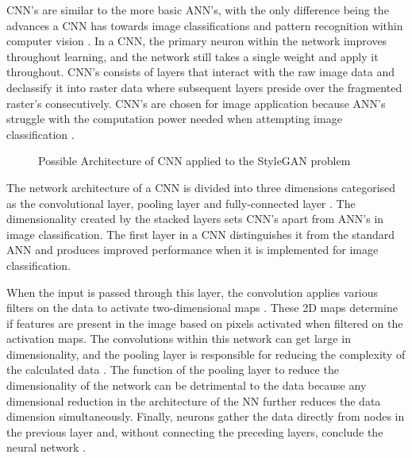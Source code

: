 CNN's are similar to the more basic ANN's, with the only difference being the advances a CNN has towards image classifications and pattern recognition within computer vision \citep{OShea2015}. In a CNN, the primary neuron within the network improves throughout learning, and the network still takes a single weight and apply it throughout. CNN's consists of layers that interact with the raw image data and declassify it into raster data where subsequent layers preside over the fragmented raster's consecutively. CNN's are chosen for image application because ANN's struggle with the computation power needed when attempting image classification \citep{OShea2015}.

\begin{figure}[H]%
\centering
{}%
\caption{Possible Architecture of CNN applied to the StyleGAN problem \citep{Karras2019, OShea2015}}%
\label{fig:9}%
\end{figure}

The network architecture of a CNN is divided into three dimensions categorised as the convolutional layer, pooling layer and fully-connected layer \citep{OShea2015}. The dimensionality created by the stacked layers sets CNN's apart from ANN's in image classification. The first layer in a CNN distinguishes it from the standard ANN and produces improved performance when it is implemented for image classification.

When the input is passed through this layer, the convolution applies various filters on the data to activate two-dimensional maps \citep{OShea2015}. These 2D maps determine if features are present in the image based on pixels activated when filtered on the activation maps. The convolutions within this network can get large in dimensionality, and the pooling layer is responsible for reducing the complexity of the calculated data \citep{OShea2015}. The function of the pooling layer to reduce the dimensionality of the network can be detrimental to the data because any dimensional reduction in the architecture of the NN further reduces the data dimension simultaneously. Finally, neurons gather the data directly from nodes in the previous layer and, without connecting the preceding layers, conclude the neural network \citep{OShea2015}.


